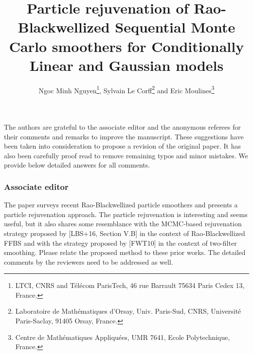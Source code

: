 


\title{Particle rejuvenation of Rao-Blackwellized Sequential Monte Carlo smoothers for Conditionally Linear and Gaussian models}
\date{}

\author{Ngoc Minh Nguyen\footnote{LTCI, CNRS and T\'el\'ecom ParisTech, 46 rue Barrault 75634 Paris Cedex 13, France.}, Sylvain {L}e {C}orff\footnote{Laboratoire de Math\'ematiques d'Orsay, Univ. Paris-Sud, CNRS, Universit\'e Paris-Saclay, 91405 Orsay, France.} and Eric Moulines\footnote{Centre de Math\'ematiques Appliqu\'ees, UMR 7641, Ecole Polytechnique, France.}}


\maketitle

The authors are grateful to the associate editor and the anonymous referees for their comments and remarks to improve the manuscript. These suggestions have been taken into consideration to propose a revision of the original paper. It has also been carefully proof read to remove remaining typos and minor mistakes. We provide below detailed answers for all comments.

\subsubsection*{Associate editor}

The paper surveys recent Rao-Blackwellized particle smoothers and presents a particle rejuvenation approach. The particle rejuvenation is interesting and seems useful, but it also shares some resemblance with the MCMC-based rejuvenation strategy proposed by [LBS+16, Section V.B] in the context of Rao-Blackwellized FFBS and with the strategy proposed by [FWT10] in the context of two-filter smoothing. Please relate the proposed method to these prior works. The detailed comments by the reviewers need to be addressed as well.

\vspace{.2cm}

